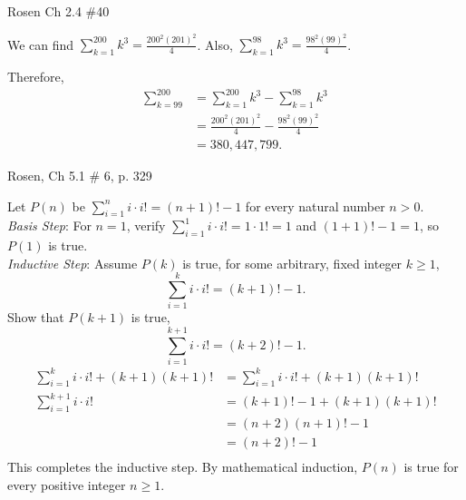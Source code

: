\documentclass[12pt,addpoints]{exam}
\newcommand{\ds}{\displaystyle}
\begin{document}
\begin{questions}
\question[6] Rosen Ch 2.4 \#40
    \ifprintanswers
        \vspace{-10pt}
   \fi
\begin{solution}
 We can find $\ds \sum_{k=1}^{200} k^3 = \frac{200^2(201)^2}{4}$.
 Also, $\ds \sum_{k=1}^{98} k^3 = \frac{98^2(99)^2}{4}$.

 Therefore,
\begin{align*}
  \sum_{k=99}^{200} &= \sum_{k=1}^{200} k^3 - \sum_{k=1}^{98} k^3\\
   &= \frac{200^2(201)^2}{4} - \frac{98^2(99)^2}{4} \\
   &= 380,447,799.
\end{align*}
\end{solution}


\question[12] Rosen, Ch 5.1 \# 6, p. 329
    \ifprintanswers
        \vspace{-10pt}
   \fi
\begin{solution}
    Let $P(n)$ be $\displaystyle \sum_{i=1}^n i\cdot i! = (n+1)! - 1$
    for every natural number $n >0$. \\

    \textit{Basis Step}: For $n=1$, verify
    $\sum_{i=1}^1 i \cdot i! = 1 \cdot 1! = 1$ and
    $(1+1)!-1 = 1$, so $P(1)$ is true. \\

    \smallskip
    \textit{Inductive Step}: Assume $P(k)$ is true, for some arbitrary, fixed integer $k \geq 1$,
    \[ \sum_{i=1}^k i\cdot i! = (k+1)! - 1. \]
    Show that $P(k+1)$ is true,
    \[ \sum_{i=1}^{k+1} i\cdot i! = (k+2)! - 1. \]
    \begin{align*}
        \sum_{i=1}^{k} i\cdot i! + (k+1)(k+1)! &= \sum_{i=1}^k i\cdot i! + (k+1)(k+1)!  \tag{add term to both sides} \\
        \sum_{i=1}^{k+1} i\cdot i!  &= (k+1)!-1 + (k+1)(k+1)! \tag{by def. of sum and ind. hyp.} \\
          &= (n+2)(n+1)! - 1  \\
          &= (n+2)! - 1 \\
    \end{align*}
    This completes the inductive step.  By mathematical induction, $P(n)$ is true for every positive integer $n\geq1$.
\end{solution}


\end{questions}
\end{document}
